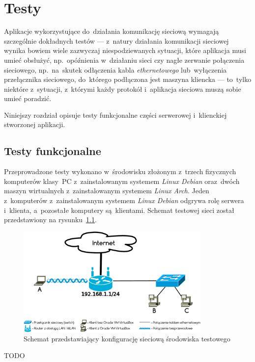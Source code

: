 \documentclass[thesis]{subfiles}
\begin{document}
\chapter{Testy}

Aplikacje wykorzystujące do~działania komunikację sieciową wymagają szczególnie dokładnych testów --- z~natury działania komunikacji sieciowej wynika bowiem wiele zazwyczaj niespodziewanych sytuacji, które aplikacja musi umieć obsłużyć, np.~opóźnienia w~działaniu sieci czy nagłe zerwanie połączenia sieciowego, np.~na~skutek odłączenia kabla \emph{ethernetowego} lub~wyłączenia przełącznika sieciowego, do~którego podłączona jest maszyna kliencka --- to~tylko niektóre z~sytuacji, z~którymi każdy protokół i~aplikacja sieciowa muszą sobie umieć poradzić.

Niniejszy rozdział opisuje testy funkcjonalne części serwerowej i~klienckiej stworzonej aplikacji.

%
%
%

\section{Testy funkcjonalne}

Przeprowadzone testy wykonano w~środowisku złożonym z~trzech fizycznych komputerów klasy~PC z~zainstalowanym systemem \emph{Linux Debian} oraz~dwóch maszyn wirtualnych  z~zainstalowanym systemem \emph{Linux Arch}. Jeden z~komputerów z~zainstalowanym systemem \emph{Linux Debian} odgrywa rolę serwera i~klienta, a~pozostałe komputery są~klientami. Schemat testowej sieci został przedstawiony na rysunku~\ref{fig:testing-network}.

\begin{figure}
	\centering
	\includegraphics[width=0.85\textwidth]{img/testing-network}
	\caption{Schemat przedstawiający konfigurację sieciową środowiska testowego}
	\label{fig:testing-network}
\end{figure}

TODO
\end{document}
